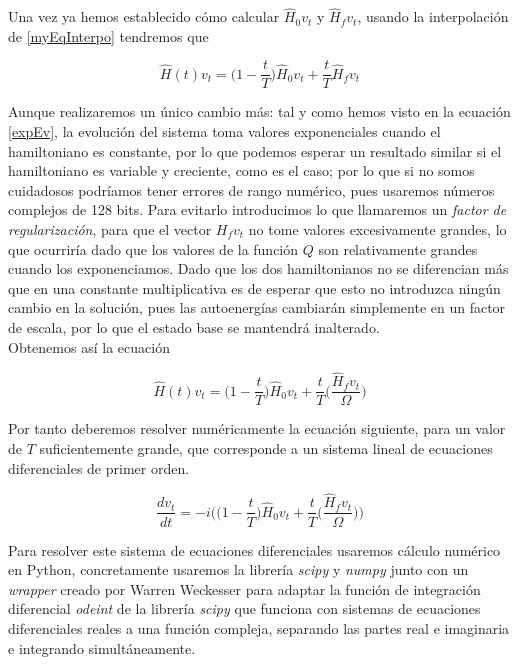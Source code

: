 \documentclass[11pt, spanish]{report}
\numberwithin{equation}{section}
\numberwithin{defin}{section}
\begin{document}
Una vez ya hemos establecido cómo calcular $\hat{H}_0v_t$ y $\hat{H}_fv_t$, usando la interpolación de \ref{myEqInterpo} tendremos que

\begin{equation}
\hat{H}(t)v_t=\Big(1-\frac{t}{T}\Big)\hat{H}_0v_t+\frac{t}{T}\hat{H}_fv_t
\end{equation}

Aunque realizaremos un único cambio más: tal y como hemos visto en la ecuación \ref{expEv}, la evolución del sistema toma valores exponenciales cuando el hamiltoniano es constante, por lo que podemos esperar un resultado similar si el hamiltoniano es variable y creciente, como es el caso; por lo que si no somos cuidadosos podríamos tener errores de rango numérico, pues usaremos números complejos de 128 bits. Para evitarlo introducimos lo que llamaremos un \emph{factor de regularización}, para que el vector $H_fv_t$ no tome valores excesivamente grandes, lo que ocurriría dado que los valores de la función $Q$ son relativamente grandes cuando los exponenciamos. Dado que los dos hamiltonianos no se diferencian más que en una constante multiplicativa es de esperar que esto no introduzca ningún cambio en la solución, pues las autoenergías cambiarán simplemente en un factor de escala, por lo que el estado base se mantendrá inalterado.\\

Obtenemos así la ecuación 

\begin{equation}
\hat{H}(t)v_t=\Big(1-\frac{t}{T}\Big)\hat{H}_0v_t+\frac{t}{T}\Big(\frac{\hat{H}_fv_t}{\Omega}\Big)
\end{equation}

Por tanto deberemos resolver numéricamente la ecuación siguiente, para un valor de $T$ suficientemente grande, que corresponde a un sistema lineal de ecuaciones diferenciales de primer orden.

\begin{equation}
\frac{d v_t}{d t}=-i\Bigg(\Big(1-\frac{t}{T}\Big)\hat{H}_0v_t+\frac{t}{T}\Big(\frac{\hat{H}_fv_t}{\Omega}\Big)\Bigg)
\end{equation}

Para resolver este sistema de ecuaciones diferenciales usaremos cálculo numérico en Python, concretamente usaremos la librería \textit{scipy} y \textit{numpy }junto con un \textit{wrapper} \cite{Warren2014} creado por Warren Weckesser para adaptar la función de integración diferencial \textit{odeint} de la librería \textit{scipy} que funciona con sistemas de ecuaciones diferenciales reales a una función compleja, separando las partes real e imaginaria e integrando simultáneamente.\\
\end{document}
